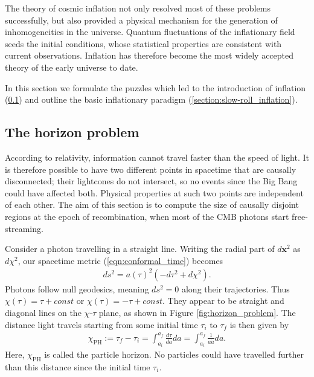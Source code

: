 The theory of cosmic inflation not only resolved most of these problems successfully, but also provided a physical mechanism for the generation of inhomogeneities in the universe. Quantum fluctuations of the inflationary field seeds the initial conditions, whose statistical properties are consistent with current observations. Inflation has therefore become the most widely accepted theory of the early universe to date.

In this section we formulate the puzzles which led to the introduction of inflation (\ref{section:the_horizon_problem}) and outline the basic inflationary paradigm (\ref{section:slow-roll_inflation}).

\subsection{The horizon problem}
\label{section:the_horizon_problem}

According to relativity, information cannot travel faster than the speed of light. It is therefore possible to have two different points in spacetime that are causally disconnected; their lightcones do not intersect, so no events since the Big Bang could have affected both. Physical properties at such two points are independent of each other. The aim of this section is to compute the size of causally disjoint regions at the epoch of recombination, when most of the CMB photons start free-streaming.

Consider a photon travelling in a straight line. Writing the radial part of $d\mathbf{x}^2$ as $d\chi^2$, our spacetime metric (\ref{eqn:conformal_time}) becomes
\begin{align}
	ds^2 = a(\tau)^2 (-d\tau^2 +d\chi^2).
\end{align}
Photons follow null geodesics, meaning $ds^2=0$ along their trajectories. Thus $\chi(\tau) = \tau + const$ or $\chi(\tau) = -\tau + const$. They appear to be straight and diagonal lines on the $\chi$-$\tau$ plane, as shown in Figure \ref{fig:horizon_problem}. The distance light travels starting from some initial time $\tau_i$ to $\tau_f$ is then given by
\begin{align}
	\chi_\text{PH} := \tau_f - \tau_i = \int_{a_i}^{a_f} \frac{d\tau}{da} da = \int_{a_i}^{a_f} \frac{1}{a\dot{a}} da. \label{def:physical_horizon}
\end{align}
Here, $\chi_\text{PH}$ is called the particle horizon. No particles could have travelled further than this distance since the initial time $\tau_i$.

